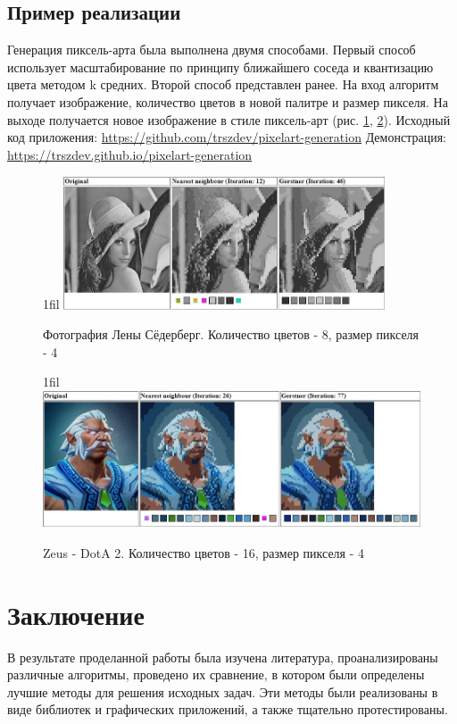 \documentclass[a4paper,12pt]{report}
\makeatletter
\theoremstyle{remark}
\newcommand*{\centerfloat}{%
  \parindent \z@
  \leftskip \z@ \@plus 1fil \@minus \textwidth
  \rightskip\leftskip
  \parfillskip \z@skip}
\makeatother
\begin{document}
\section{Пример реализации}

Генерация пиксель-арта была выполнена двумя способами. Первый способ использует масштабирование по принципу ближайшего соседа и квантизацию цвета методом k средних. Второй способ представлен ранее. На вход алгоритм получает изображение, количество цветов в новой палитре и размер пикселя. На выходе получается новое изображение в стиле пиксель-арт (рис. \ref{fig:pixel-impl}, \ref{fig:pixel-impl2}).
\newline
\newline
Исходный код приложения: \url{https://github.com/trszdev/pixelart-generation}
\newline
Демонстрация: \url{https://trszdev.github.io/pixelart-generation}

\begin{figure}
    \centerfloat
    \includegraphics[width=0.85\textwidth]{pixel/2.jpg}
    \caption{Фотография Лены Сёдерберг. Количество цветов - 8, размер пикселя - 4}
    \label{fig:pixel-impl}
\end{figure}

\begin{figure}
    \centerfloat
    \includegraphics[width=1\textwidth]{pixel/3.jpg}
    \caption{Zeus - DotA 2. Количество цветов - 16, размер пикселя - 4}
    \label{fig:pixel-impl2}
\end{figure}

\chapter{Заключение}

\parindent=1cm
В результате проделанной работы была изучена литература, проанализированы различные алгоритмы, проведено их сравнение, в котором были определены лучшие методы для решения исходных задач. Эти методы были реализованы в виде библиотек и графических приложений, а также тщательно протестированы.



\end{document}
